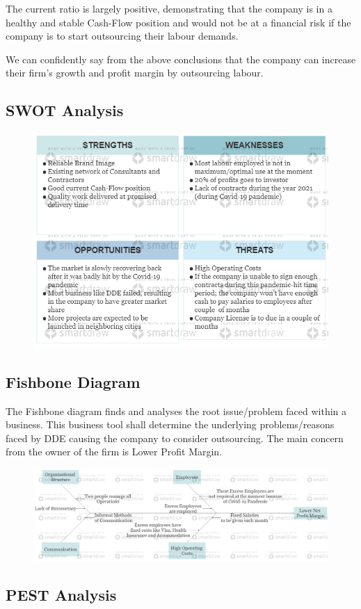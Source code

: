 	{The current ratio is largely positive, demonstrating that the company is in a healthy and stable Cash-Flow position and would not be at a financial risk if the company is to start outsourcing their labour demands.}	
	
	{We can confidently say from the above conclusions that the company can  increase their firm's growth and profit margin by outsourcing labour.}

\subsection{SWOT Analysis}

	{}
	
	\begin{figure}[H]
    	\centering
    	\includegraphics[width=15cm]{SWOT Analysis.png}
    	\label{}
	\end{figure}

	{}	

\subsection{Fishbone Diagram}

	{The Fishbone diagram finds and analyses the root issue/problem faced within a business. This business tool shall determine the underlying problems/reasons faced by DDE causing the company to consider outsourcing. The main concern from the owner of the firm is Lower Profit Margin.}
	
	\begin{figure}[H]
    	\centering
    	\includegraphics[width=15cm]{Fishbone Diagram.png}
    	\label{}
	\end{figure}

	{}
	
	{}
	
	{}

\subsection{PEST Analysis}

	{}

